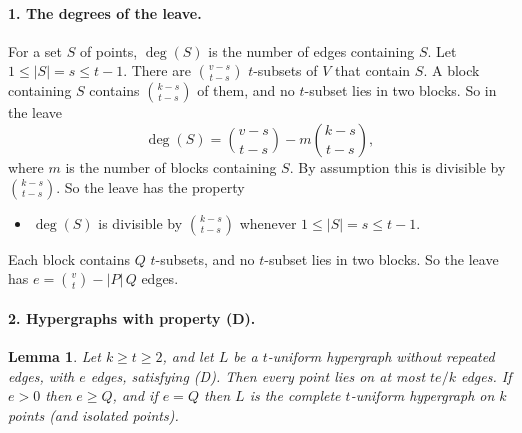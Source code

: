 \documentclass[11pt,a4paper]{article}
\newtheorem{lemma}{Lemma}
\newcommand{\abs}[1]{\lvert #1\rvert}
\begin{document}
\paragraph{1. The degrees of the leave.}
For a set $S$ of points, $\deg(S)$ is the number of edges containing $S$.
Let $1\le\abs{S}=s\le t-1$. There are $\binom{v-s}{t-s}$ $t$-subsets of $V$
that contain $S$. A block containing $S$ contains $\binom{k-s}{t-s}$ of them,
and no $t$-subset lies in two blocks. So in the leave
\[
\deg(S)=\binom{v-s}{t-s}-m\binom{k-s}{t-s},
\]
where $m$ is the number of blocks containing $S$. By assumption this is
divisible by $\binom{k-s}{t-s}$. So the leave has the property
\begin{itemize}
\item[(D)] $\deg(S)$ is divisible by $\binom{k-s}{t-s}$ whenever
$1\le\abs{S}=s\le t-1$.
\end{itemize}
Each block contains $Q$ $t$-subsets, and no $t$-subset lies in two blocks.
So the leave has $e=\binom{v}{t}-\abs{P}\,Q$ edges.

\paragraph{2. Hypergraphs with property (D).}

\begin{lemma}
Let $k\ge t\ge 2$, and let $L$ be a $t$-uniform hypergraph without repeated
edges, with $e$ edges, satisfying {\rm (D)}. Then every point lies on at most
$te/k$ edges. If $e>0$ then $e\ge Q$, and if $e=Q$ then $L$ is the complete
$t$-uniform hypergraph on $k$ points (and isolated points).
\end{lemma}
\end{document}
